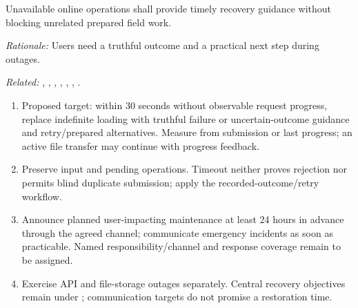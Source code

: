 \label{nfr:AOC-06}
Unavailable online operations shall provide timely recovery guidance without blocking unrelated prepared field work.

\textit{Rationale:} Users need a truthful outcome and a practical next step during outages.

\textit{Related:} \hyperref[fr:004]{}, \hyperref[fr:034]{}, \hyperref[fr:037]{}, \hyperref[fr:038]{}, \hyperref[fr:043]{}, \hyperref[fr:048]{}, \hyperref[fr:062]{}.
\begin{enumerate}[label=(\alph*),leftmargin=*,itemsep=1pt,topsep=3pt]
\item Proposed target: within 30 seconds without observable request progress, replace indefinite loading with truthful failure or uncertain-outcome guidance and retry/prepared alternatives. Measure from submission or last progress; an active file transfer may continue with progress feedback.
\item Preserve input and pending operations. Timeout neither proves rejection nor permits blind duplicate submission; apply the recorded-outcome/retry workflow.
\item Announce planned user-impacting maintenance at least 24 hours in advance through the agreed channel; communicate emergency incidents as soon as practicable. Named responsibility/channel and response coverage remain to be assigned.
\item Exercise API and file-storage outages separately. Central recovery objectives remain under ; communication targets do not promise a restoration time.
\end{enumerate}
